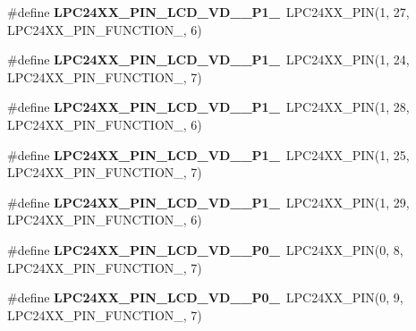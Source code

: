 \begin{DoxyCompactItemize}
\item 
\mbox{\label{group__lpc24xx__io_gaabebf79221769aa13610e2eb75f5ecc1}} 
\#define {\bfseries L\+P\+C24\+X\+X\+\_\+\+P\+I\+N\+\_\+\+L\+C\+D\+\_\+\+V\+D\+\_\+\_\+\+P1\+\_}~L\+P\+C24\+X\+X\+\_\+\+P\+IN(1, 27, L\+P\+C24\+X\+X\+\_\+\+P\+I\+N\+\_\+\+F\+U\+N\+C\+T\+I\+O\+N\+\_, 6)
\item 
\mbox{\label{group__lpc24xx__io_ga64c17311e622ce16d576bf1ea6d4a087}} 
\#define {\bfseries L\+P\+C24\+X\+X\+\_\+\+P\+I\+N\+\_\+\+L\+C\+D\+\_\+\+V\+D\+\_\+\_\+\+P1\+\_}~L\+P\+C24\+X\+X\+\_\+\+P\+IN(1, 24, L\+P\+C24\+X\+X\+\_\+\+P\+I\+N\+\_\+\+F\+U\+N\+C\+T\+I\+O\+N\+\_, 7)
\item 
\mbox{\label{group__lpc24xx__io_gaf5ab839b3b6af4d9fc5eed946371f468}} 
\#define {\bfseries L\+P\+C24\+X\+X\+\_\+\+P\+I\+N\+\_\+\+L\+C\+D\+\_\+\+V\+D\+\_\+\_\+\+P1\+\_}~L\+P\+C24\+X\+X\+\_\+\+P\+IN(1, 28, L\+P\+C24\+X\+X\+\_\+\+P\+I\+N\+\_\+\+F\+U\+N\+C\+T\+I\+O\+N\+\_, 6)
\item 
\mbox{\label{group__lpc24xx__io_ga10a29f81b4bfc73200d052e53f8c4755}} 
\#define {\bfseries L\+P\+C24\+X\+X\+\_\+\+P\+I\+N\+\_\+\+L\+C\+D\+\_\+\+V\+D\+\_\+\_\+\+P1\+\_}~L\+P\+C24\+X\+X\+\_\+\+P\+IN(1, 25, L\+P\+C24\+X\+X\+\_\+\+P\+I\+N\+\_\+\+F\+U\+N\+C\+T\+I\+O\+N\+\_, 7)
\item 
\mbox{\label{group__lpc24xx__io_ga4c43cbd3475cf1524b1f0f3630890be9}} 
\#define {\bfseries L\+P\+C24\+X\+X\+\_\+\+P\+I\+N\+\_\+\+L\+C\+D\+\_\+\+V\+D\+\_\+\_\+\+P1\+\_}~L\+P\+C24\+X\+X\+\_\+\+P\+IN(1, 29, L\+P\+C24\+X\+X\+\_\+\+P\+I\+N\+\_\+\+F\+U\+N\+C\+T\+I\+O\+N\+\_, 6)
\item 
\mbox{\label{group__lpc24xx__io_gaab08ee46ab6954ed7a8f8a859c24489c}} 
\#define {\bfseries L\+P\+C24\+X\+X\+\_\+\+P\+I\+N\+\_\+\+L\+C\+D\+\_\+\+V\+D\+\_\+\_\+\+P0\+\_}~L\+P\+C24\+X\+X\+\_\+\+P\+IN(0, 8, L\+P\+C24\+X\+X\+\_\+\+P\+I\+N\+\_\+\+F\+U\+N\+C\+T\+I\+O\+N\+\_, 7)
\item 
\mbox{\label{group__lpc24xx__io_ga0193285d0d5f018c36be5332030c99e6}} 
\#define {\bfseries L\+P\+C24\+X\+X\+\_\+\+P\+I\+N\+\_\+\+L\+C\+D\+\_\+\+V\+D\+\_\+\_\+\+P0\+\_}~L\+P\+C24\+X\+X\+\_\+\+P\+IN(0, 9, L\+P\+C24\+X\+X\+\_\+\+P\+I\+N\+\_\+\+F\+U\+N\+C\+T\+I\+O\+N\+\_, 7)

\end{DoxyCompactItemize}
